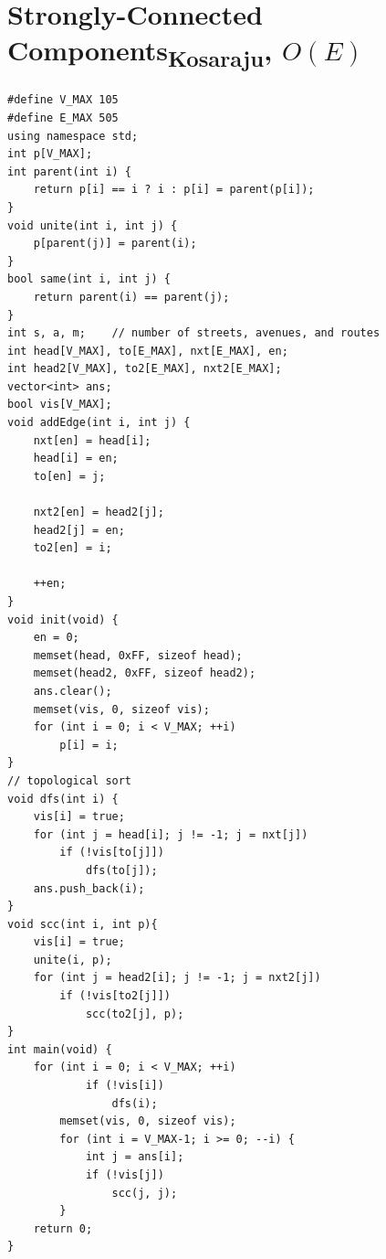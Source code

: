 \documentclass[12pt]{book}
\begin{document}
\section{Strongly-Connected Components\textsubscript{Kosaraju}, $O(E)$}
\begin{verbatim}
#define V_MAX 105
#define E_MAX 505
using namespace std;
int p[V_MAX];
int parent(int i) {
	return p[i] == i ? i : p[i] = parent(p[i]);
}
void unite(int i, int j) {
	p[parent(j)] = parent(i);
}
bool same(int i, int j) {
	return parent(i) == parent(j);
}
int s, a, m;	// number of streets, avenues, and routes
int head[V_MAX], to[E_MAX], nxt[E_MAX], en;
int head2[V_MAX], to2[E_MAX], nxt2[E_MAX];
vector<int> ans;
bool vis[V_MAX];
void addEdge(int i, int j) {
	nxt[en] = head[i];
	head[i] = en;
	to[en] = j;

	nxt2[en] = head2[j];
	head2[j] = en;
	to2[en] = i;

	++en;
}
void init(void) {
	en = 0;
	memset(head, 0xFF, sizeof head);
	memset(head2, 0xFF, sizeof head2);
	ans.clear();
	memset(vis, 0, sizeof vis);
	for (int i = 0; i < V_MAX; ++i)
		p[i] = i;
}
// topological sort
void dfs(int i) {
	vis[i] = true;
	for (int j = head[i]; j != -1; j = nxt[j])
		if (!vis[to[j]])
			dfs(to[j]);
	ans.push_back(i);
}
void scc(int i, int p){
	vis[i] = true;
	unite(i, p);
	for (int j = head2[i]; j != -1; j = nxt2[j])
		if (!vis[to2[j]])
			scc(to2[j], p);
}
int main(void) {
	for (int i = 0; i < V_MAX; ++i)
			if (!vis[i])
				dfs(i);
		memset(vis, 0, sizeof vis);
		for (int i = V_MAX-1; i >= 0; --i) {
			int j = ans[i];
			if (!vis[j])
				scc(j, j);
		}
	return 0;
}
\end{verbatim}
\end{document}
